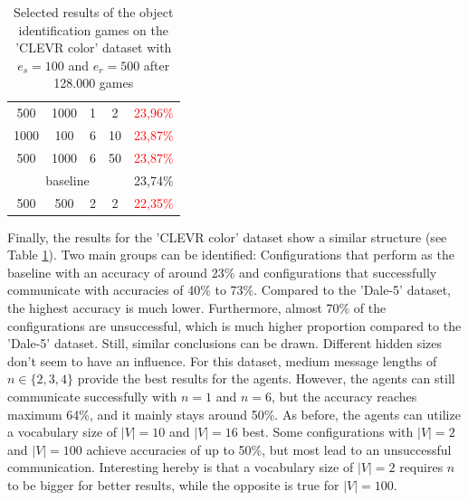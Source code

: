 \begin{table}[ht]
\begin{tabular}{cccc|c}
        {500}                         & {1000}    & {1} & {2}   & \textcolor{red}{23,96\%}                 \\
        {1000}                        & {100}     & {6} & {10}  & \textcolor{red}{23,87\%}                 \\
        {500}                         & {1000}    & {6} & {50}  & \textcolor{red}{23,87\%}                 \\\midrule
        \multicolumn{4}{c|}{baseline} & {23,74\%}                                                          \\\midrule
        {500}                         & {500}     & {2} & {2}   & \textcolor{red}{22,35\%}                 \\
        \bottomrule
    \end{tabular}
    \caption{Selected results of the object identification games on the 'CLEVR color' dataset with $e_s=100$ and $e_r=500$ after 128.000 games}
    \label{tab:results_discriminator_color}
\end{table}

Finally, the results for the 'CLEVR color' dataset show a similar structure (see Table \ref{tab:results_discriminator_color}).
Two main groups can be identified: Configurations that perform as the baseline with an accuracy of around 23\% and configurations that successfully communicate with accuracies of 40\% to 73\%.
Compared to the 'Dale-5' dataset, the highest accuracy is much lower.
Furthermore, almost 70\% of the configurations are unsuccessful, which is much higher proportion compared to the 'Dale-5' dataset.
Still, similar conclusions can be drawn.
Different hidden sizes don't seem to have an influence.
For this dataset, medium message lengths of $n \in \{2,3,4\}$ provide the best results for the agents.
However, the agents can still communicate successfully with $n=1$ and $n=6$, but the accuracy reaches maximum 64\%, and it mainly stays around 50\%.
As before, the agents can utilize a vocabulary size of $|V|=10$ and $|V|=16$ best.
Some configurations with $|V|=2$ and $|V|=100$ achieve accuracies of up to 50\%, but most lead to an unsuccessful communication.
Interesting hereby is that a vocabulary size of $|V|=2$ requires $n$ to be bigger for better results, while the opposite is true for $|V|=100$.

